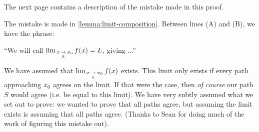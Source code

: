 \documentclass{article}
\theoremstyle{mytheoremstyle}
\newcommand{\R}{\mathbb R}
\begin{document}
\newpage

The next page contains a description of the mistake made in this proof.

\newpage

The mistake is made in \cref{lemma:limit-composition}. Between lines (A) and (B), we have the phrase:

\begin{center}
``We will call $\limx{\R}{x}{x_0} f(x) = L$, giving ...''
\end{center}

We have assumed that $\limx{\R}{x}{x_0}f(x)$ exists. This limit only exists if every path approaching $x_0$ agrees on the limit. If that were the case, then \textit{of course} our path $S$ would agree (i.e. be equal to this limit). We have very subtly assumed what we set out to prove: we wanted to prove that all paths agree, but assuming the limit exists is assuming that all paths agree. (Thanks to Sean for doing much of the work of figuring this mistake out).
\end{document}
